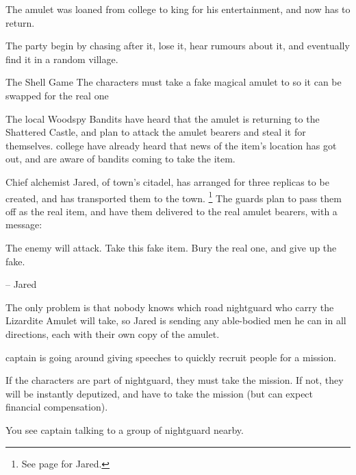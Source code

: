 \begin{multicols}{2}

\par\noindent
The amulet was loaned from \gls{college} to \gls{king} for his entertainment, and now has to return.

The party begin by chasing after it, lose it, hear rumours about it, and eventually find it in a random village.

{The Shell Game}%
{The characters must take a fake magical amulet to  so it can be swapped for the real one}%

The local Woodspy Bandits have heard that the amulet is returning to the Shattered Castle, and plan to attack the amulet bearers and steal it for themselves.
\Gls{college} have already heard that news of the item's location has got out, and are aware of bandits coming to take the item.

Chief alchemist Jared, of \gls{town}'s citadel, has arranged for three replicas to be created, and has transported them to the town.%
\footnote{See page \pageref{citadel_alchemist} for Jared.}
The guards plan to pass them off as the real item, and have them delivered to the real amulet bearers, with a message:

\begin{boxtext}

	The enemy will attack.
	Take this fake item.
	Bury the real one, and give up the fake.

	-- Jared

\end{boxtext}

The only problem is that nobody knows which road \gls{nightguard} who carry the Lizardite Amulet will take, so Jared is sending any able-bodied men he can in all directions, each with their own copy of the amulet.

\Gls{captain} is going around giving speeches to quickly recruit people for a mission.

If the characters are part of \gls{nightguard}, they must take the mission.
If not, they will be instantly deputized, and have to take the mission (but can expect financial compensation).

\begin{boxtext}

	You see \gls{captain} talking to a group of \gls{nightguard} nearby.

	\begin{quotation}


\end{quotation}
\end{boxtext}
\end{multicols}
